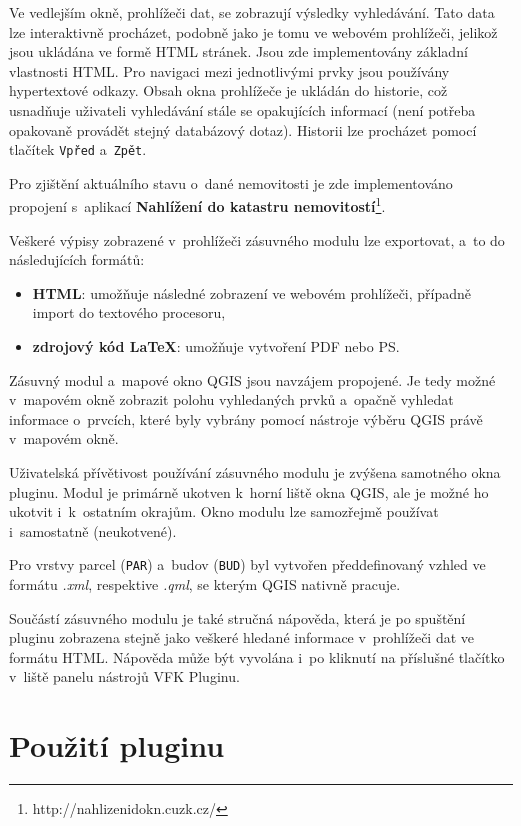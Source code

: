 \documentclass[a4paper,12pt,oneside]{book}
\newcommand{\latex}{\LaTeX}
\begin{document}
Ve vedlejším okně, prohlížeči dat, se zobrazují výsledky vyhledávání. Tato data lze interaktivně procházet, podobně jako je tomu ve webovém prohlížeči, jelikož jsou ukládána ve formě HTML stránek. Jsou zde implementovány základní vlastnosti HTML. Pro navigaci mezi jednotlivými prvky jsou používány hypertextové odkazy. Obsah okna prohlížeče je ukládán do historie, což usnadňuje uživateli vyhledávání stále se opakujících informací (není potřeba opakovaně provádět stejný databázový dotaz). Historii lze procházet pomocí tlačítek \texttt{Vpřed} a~\texttt{Zpět}.

Pro zjištění aktuálního stavu o~dané nemovitosti je zde implementováno propojení s~aplikací \textbf{Nahlížení do katastru nemovitostí}\footnote{http://nahlizenidokn.cuzk.cz/}.

Veškeré výpisy zobrazené v~prohlížeči zásuvného modulu lze exportovat, a~to do následujících formátů:

\begin{itemize}
 \item \textbf{HTML}: umožňuje následné zobrazení ve webovém prohlížeči, případně import do textového procesoru,
 \item \textbf{zdrojový kód \latex}: umožňuje vytvoření PDF nebo PS.
\end{itemize}

Zásuvný modul a~mapové okno QGIS jsou navzájem propojené. Je tedy možné v~mapovém okně zobrazit polohu vyhledaných prvků a~opačně vyhledat informace o~prvcích, které byly vybrány pomocí nástroje výběru QGIS právě v~mapovém okně.

Uživatelská přívětivost používání zásuvného modulu je zvýšena  samotného okna pluginu. Modul je primárně ukotven k~horní liště okna QGIS, ale je možné ho ukotvit i~k~ostatním okrajům. Okno modulu lze samozřejmě používat i~samostatně (neukotvené).

Pro vrstvy parcel (\texttt{PAR}) a~budov (\texttt{BUD}) byl vytvořen předdefinovaný vzhled ve formátu \textit{.xml}, respektive \textit{.qml}, se kterým QGIS nativně pracuje. 

Součástí zásuvného modulu je také stručná nápověda, která je po spuštění pluginu zobrazena stejně jako veškeré hledané informace v~prohlížeči dat ve formátu HTML. Nápověda může být vyvolána i~po kliknutí na příslušné tlačítko v~liště panelu nástrojů VFK Pluginu. \cite{cvut_vfkPlugin}

\newpage
\section{Použití pluginu}
\end{document}
